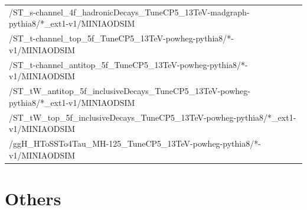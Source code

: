 \begin{table}[htb]
\begin{center}
\begin{tabular}{l}
      /ST\_s-channel\_4f\_hadronicDecays\_TuneCP5\_13TeV-madgraph-pythia8/*\_ext1-v1/MINIAODSIM \\
      /ST\_t-channel\_top\_5f\_TuneCP5\_13TeV-powheg-pythia8/*-v1/MINIAODSIM \\
      /ST\_t-channel\_antitop\_5f\_TuneCP5\_13TeV-powheg-pythia8/*-v1/MINIAODSIM \\
      /ST\_tW\_antitop\_5f\_inclusiveDecays\_TuneCP5\_13TeV-powheg-pythia8/*\_ext1-v1/MINIAODSIM \\
      /ST\_tW\_top\_5f\_inclusiveDecays\_TuneCP5\_13TeV-powheg-pythia8/*\_ext1-v1/MINIAODSIM \\
      \hline
      /ggH\_HToSSTo4Tau\_MH-125\_TuneCP5\_13TeV-powheg-pythia8/*-v1/MINIAODSIM\\
      \hline
    \end{tabular}
    \label{tab:18samplesummary}
  \end{center}
\end{table}












\chapter{Others}

